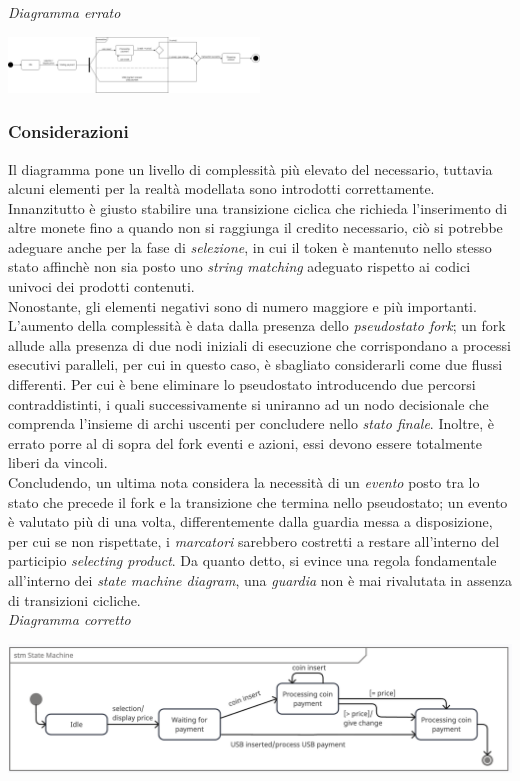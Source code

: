 \documentclass{article}
\begin{document}
\textit{Diagramma errato}
\begin{center}
\includegraphics[width=0.5\textwidth]{foto 6.png}    
\end{center}

\subsubsection*{Considerazioni}
Il diagramma pone un livello di complessità più elevato del necessario, tuttavia alcuni elementi per la realtà modellata sono introdotti correttamente. Innanzitutto è giusto stabilire una transizione ciclica che richieda l'inserimento di altre monete fino a quando non si raggiunga il credito necessario, ciò si potrebbe adeguare anche per la fase di \textit{selezione}, in cui il token è mantenuto nello stesso stato affinchè non sia posto uno \textit{string matching} adeguato rispetto ai codici univoci dei prodotti contenuti.\vspace*{14pt}\\
Nonostante, gli elementi negativi sono di numero maggiore e più importanti. L'aumento della complessità è data dalla presenza dello \textit{pseudostato fork}; un fork allude alla presenza di due nodi iniziali di esecuzione che corrispondano a processi esecutivi paralleli, per cui in questo caso, è sbagliato considerarli come due flussi differenti. Per cui è bene eliminare lo pseudostato introducendo due percorsi contraddistinti, i quali successivamente si uniranno ad un nodo decisionale che comprenda l'insieme di archi uscenti per concludere nello \textit{stato finale}. Inoltre, è errato porre al di sopra del fork eventi e azioni, essi devono essere totalmente liberi da vincoli.\vspace*{14pt}\\
Concludendo, un ultima nota considera la necessità di un \textit{evento} posto tra lo stato che precede il fork e la transizione che termina nello pseudostato; un evento è valutato più di una volta, differentemente dalla guardia messa a disposizione, per cui se non rispettate, i \textit{marcatori} sarebbero costretti a restare all'interno del participio \textit{selecting product}. Da quanto detto, si evince una regola fondamentale all'interno dei \textit{state machine diagram}, una \textit{guardia} non è mai rivalutata in assenza di transizioni cicliche.\vspace*{14pt}\\
\textit{Diagramma corretto}
\begin{center}
    \includegraphics[width=1\textwidth]{foto 7.png}
\end{center}
\end{document}
